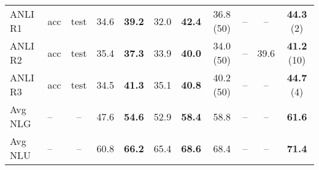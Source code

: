 \documentclass{article}
\begin{document}
\begin{table*}[b]
\begin{tabular}{llccccccccc}
\addlinespace
        ANLI R1 & acc & test & 34.6 & \textbf{39.2}
& 32.0 & \textbf{42.4} & 36.8 (50) & -- & -- & \textbf{44.3} (2)\\
ANLI R2 & acc & test & 35.4 & \textbf{37.3}
& 33.9 & \textbf{40.0} & 34.0 (50) & -- & 39.6 & \textbf{41.2} (10)\\
ANLI R3 & acc & test & 34.5 & \textbf{41.3}
& 35.1 & \textbf{40.8} & 40.2 (50) &  -- &-- & \textbf{44.7} (4)\\
\addlinespace
        Avg NLG & -- & -- & 47.6 & \textbf{54.6} & 52.9 & \textbf{58.4} & 58.8 & -- & --& \textbf{61.6} \\
        Avg NLU & -- & -- & 60.8 & \textbf{66.2} & 65.4 & \textbf{68.6} & 68.4 & -- & -- &\textbf{71.4} \\      
        \bottomrule
    \end{tabular}

\end{table*}
\clearpage
\end{document}
